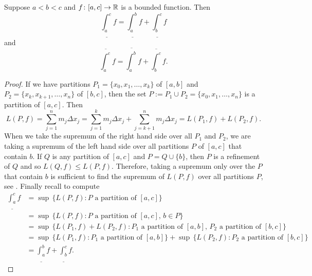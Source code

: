 \begin{lemma} \label{lemma:darbouxadd}
Suppose $a < b < c$ and $f \colon [a,c] \to {\mathbb{R}}$ is a bounded function.
Then
\begin{equation*}
\underline{\int_a^c} f
=
\underline{\int_a^b} f
+
\underline{\int_b^c} f
\end{equation*}
and
\begin{equation*}
\overline{\int_a^c} f
=
\overline{\int_a^b} f
+
\overline{\int_b^c} f .
\end{equation*}
\end{lemma}

\begin{proof}
If we have partitions $P_1 = \{ x_0,x_1,\ldots,x_k \}$
of $[a,b]$ and $P_2 = \{ x_k, x_{k+1}, \ldots, x_n \}$ of $[b,c]$,
then the set $P := P_1 \cup P_2 = \{ x_0, x_1, \ldots, x_n \}$ is
a partition of $[a,c]$.  Then
\begin{equation*}
L(P,f) =
\sum_{j=1}^n m_j \Delta x_j
=
\sum_{j=1}^k m_j \Delta x_j
+
\sum_{j=k+1}^n m_j \Delta x_j
=
L(P_1,f) + L(P_2,f) .
\end{equation*}
When we take the supremum of the right hand side over all $P_1$ and $P_2$,
we are taking a supremum of the left hand side
over all partitions $P$ of $[a,c]$ that contain $b$.  If $Q$ is any partition
of $[a,c]$ and $P = Q \cup \{ b \}$, then $P$ is a refinement of $Q$
and so $L(Q,f) \leq L(P,f)$.  Therefore, taking a supremum only over the $P$
that contain $b$ is sufficient to find the supremum of $L(P,f)$
over all partitions $P$, see .
Finally recall 
to compute
\begin{equation*}
\begin{split}
\underline{\int_a^c} f
& =
\sup \, \bigl\{ L(P,f) : \text{$P$ a partition of $[a,c]$} \bigr\}
\\
& =
\sup \, \bigl\{ L(P,f) : \text{$P$ a partition of $[a,c]$, $b \in P$} \bigr\}
\\
& =
\sup \, \bigl\{ L(P_1,f) + L(P_2,f) :
\text{$P_1$ a partition of $[a,b]$, $P_2$ a partition of $[b,c]$} \bigr\}
\\
& =
\sup \, \bigl\{ L(P_1,f) : \text{$P_1$ a partition of $[a,b]$} \bigr\}
+
\sup \, \bigl\{ L(P_2,f) : \text{$P_2$ a partition of $[b,c]$} \bigr\}
\\
&=
\underline{\int_a^b} f + \underline{\int_b^c} f .
\end{split}
\end{equation*}


\end{proof}

